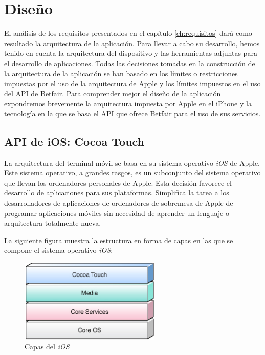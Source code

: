 \chapter{Diseño}
\label{ch:diseno}
 
  El análisis de los requisitos presentados en el capítulo \ref{ch:requisitos} dará como resultado la arquitectura de la aplicación. Para llevar a cabo su desarrollo, hemos tenido en cuenta la arquitectura del dispositivo y las herramientas adjuntas para el desarrollo de aplicaciones. Todas las decisiones tomadas en la construcción de la arquitectura de la aplicación se han basado en los límites o restricciones impuestas por el uso de la arquitectura de Apple y los límites impuestos en el uso del API de Betfair. Para comprender mejor el diseño de la aplicación expondremos brevemente la arquitectura impuesta por Apple en el iPhone y la tecnología en la que se basa el API que ofrece Betfair para el uso de sus servicios.

\section{API de iOS: Cocoa Touch}
 La arquitectura del terminal móvil se basa en su sistema operativo \emph{iOS} de Apple. Este sistema operativo, a grandes rasgos, es un subconjunto del sistema operativo que llevan los ordenadores personales de Apple. Esta decisión favorece el desarrollo de aplicaciones para sus plataformas. Simplifica la tarea a los desarrolladores de aplicaciones de ordenadores de sobremesa de Apple de programar aplicaciones móviles sin necesidad de aprender un lenguaje o arquitectura totalmente nueva.
 

\noindent
La siguiente figura muestra la estructura en forma de capas en las que se compone el sistema operativo \emph{iOS}:


\begin{figure} [h]
  \centering
    \includegraphics[width=0.6\textwidth]{./images/overview_systemlayers.jpg}
  \caption{Capas del \emph{iOS}}
  \label{fig:Capas-del-iOS}
\end{figure}

